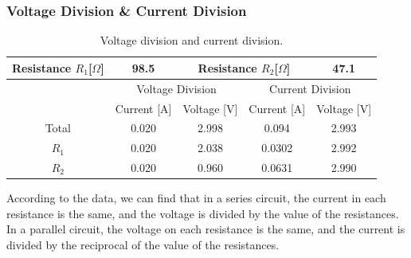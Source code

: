\documentclass{article}
\begin{document}
\subsubsection{Voltage Division \& Current Division}
\begin{table}[!h]
\begin{center}
\begin{tabular}{|c|c|c|c|c|c|}
\hline
\multicolumn{2}{|c|}{Resistance $R_1$[$\Omega$]} & 98.5 &
\multicolumn{2}{|c|}{Resistance $R_2$[$\Omega$]} & 47.1\\
\hline
\multicolumn{2}{|c|}{\multirow{2}{*}{}} & \multicolumn{2}{|c|}{Voltage Division} &
\multicolumn{2}{|c|}{Current Division}\\
\cline{3-6}
\multicolumn{2}{|c|}{} & Current [A] & Voltage [V] & Current [A] & Voltage [V]\\
\hline
\multicolumn{2}{|c|}{Total}	&	0.020	&	2.998	&	0.094	&	2.993\\
\hline
\multicolumn{2}{|c|}{$R_1$}	&	0.020	&	2.038	&	0.0302	&	2.992\\
\hline
\multicolumn{2}{|c|}{$R_2$}	&	0.020	&	0.960	&	0.0631	&	2.990\\
\hline
\end{tabular}
\caption{Voltage division and current division.}
\label{tab-2}
\end{center}
\end{table}
According to the data, we can find that in a series circuit, the current in each resistance is the same, and the voltage is divided by the value of the resistances. In a parallel circuit, the voltage on each resistance is the same, and the current is divided by the reciprocal of the value of the resistances.
\end{document}
